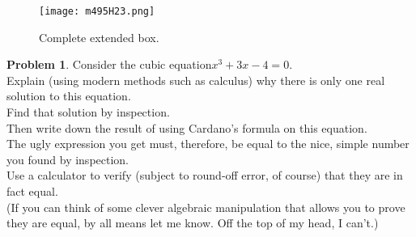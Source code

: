 \documentclass[10pt]{article}
\theoremstyle{plain}
\theoremstyle{definition}
\newtheorem{prob}{Problem}
\theoremstyle{remark}
\begin{document}
\smallskip
\begin{figure}[ht]
\begin{center}
\texttt{[image: m495H23.png]}
\end{center}
\caption{Complete extended box.}
\end{figure}


\pagebreak


\begin{prob}
Consider the cubic equation$x^3 + 3x - 4 = 0$. \\
\smallskip
Explain (using modern methods such as calculus) why there is only one real solution to this equation. \\
Find that solution by inspection. \\
Then write down the result of using Cardano's formula on this equation. \\
The ugly expression you get must, therefore, be equal to the nice, simple number you found by inspection. \\
Use a calculator to verify (subject to round-off error, of course) that they are in fact equal. \\
(If you can think of some clever algebraic manipulation that allows you to prove they are equal, by all means let me know. Off the top of my head, I can't.) 
\end{prob}

\medskip
\end{document}
